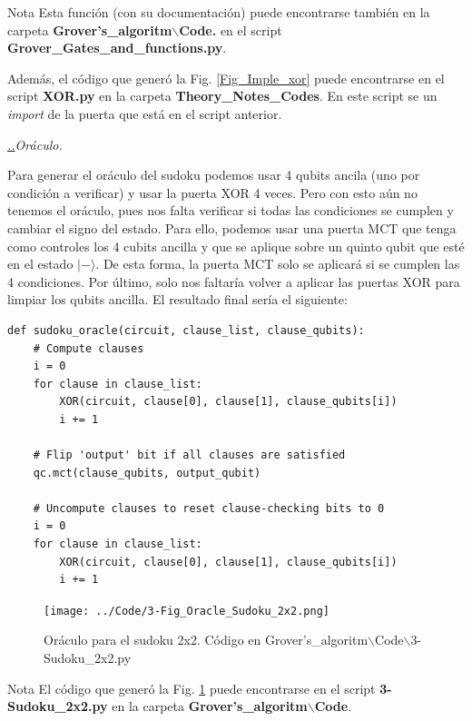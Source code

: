 \documentclass[a4paper,11pt]{article} %
\numberwithin{equation}{section}
\newcounter{subsubsubsection}[subsubsection]
\def\subsubii{\par\addtocounter{subsubsubsection}{1}\underline{\it 
\thesubsubsection.\thesubsubsubsection.}\hskip0.5cm}
\begin{document}
	\begin{mybox}{Nota}
	Esta función (con su documentación) puede encontrarse también en la carpeta 
	\textbf{Grover's\_algoritm$\backslash$Code.} en el script  \textbf{Grover\_Gates\_and\_functions.py}. 
	
	Además, el código que generó la Fig. \ref{Fig_Imple_xor} puede encontrarse en el script
	 \textbf{XOR.py} en la carpeta \textbf{Theory\_Notes\_Codes}. En este script se un \textit{import}
	de la puerta que está en el script anterior.
	\end{mybox}

			\subsubii \textit{Oráculo.} 

Para generar el oráculo del sudoku podemos usar 4 qubits ancila (uno por condición a verificar) y usar la puerta XOR 4 veces. Pero con esto aún no tenemos el oráculo, pues nos falta verificar si todas las condiciones se cumplen y cambiar el signo del estado. Para ello, podemos usar una puerta MCT que tenga como controles los 4 cubits ancilla y que se aplique sobre un quinto qubit que esté en el estado $|-\rangle$. De esta forma, la puerta MCT solo se aplicará si se cumplen las 4 condiciones. Por último, solo nos faltaría volver a aplicar las puertas XOR para limpiar los qubits ancilla. El resultado final sería el siguiente:

\begin{lstlisting}
def sudoku_oracle(circuit, clause_list, clause_qubits):
    # Compute clauses
    i = 0
    for clause in clause_list:
        XOR(circuit, clause[0], clause[1], clause_qubits[i])
        i += 1

    # Flip 'output' bit if all clauses are satisfied
    qc.mct(clause_qubits, output_qubit)

    # Uncompute clauses to reset clause-checking bits to 0
    i = 0
    for clause in clause_list:
        XOR(circuit, clause[0], clause[1], clause_qubits[i])
        i += 1
\end{lstlisting}

	\begin{figure}[H]
	\centering 
	\texttt{[image: ../Code/3-Fig\_Oracle\_Sudoku\_2x2.png]}
	\caption{Oráculo para el sudoku 2x2. Código en Grover's\_algoritm$\backslash$Code$\backslash$3-Sudoku\_2x2.py }
	\label{Fig_Imple_Oracle_sudoku_2x2}
	\end{figure}

	\begin{mybox}{Nota}	
	El código que generó la Fig. \ref{Fig_Imple_Oracle_sudoku_2x2} puede encontrarse en el script
	\textbf{3-Sudoku\_2x2.py} en la carpeta \textbf{Grover's\_algoritm$\backslash$Code}.
	\end{mybox}
\end{document}
